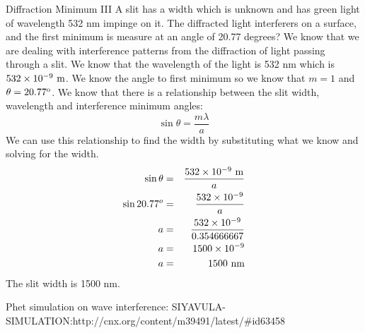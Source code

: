 \begin{wex}{Diffraction Minimum III}
{A slit has a width which is unknown and has green light of wavelength 532 nm impinge on it. The diffracted light interferers on a surface, and the first minimum is measure at an angle of 20.77 degrees? }
{
We know that we are dealing with interference patterns from the diffraction of light passing through a slit. We know that the wavelength of the light is 532 nm which is $532 \times 10^{-9}\ \rm{m}$. We know the angle to first minimum so we know that $m=1$ and $\theta = 20.77^{\rm{o}}$.
We know that there is a relationship between the slit width, wavelength and interference minimum angles:
\begin{equation*}
\sin\theta = \frac{m\lambda}{a}
\end{equation*}
We can use this relationship to find the width by substituting what we know and solving for the width.
\begin{eqnarray*}
\sin\theta &=& \frac{532\times 10^{-9} \ \rm{m}}{a} \\
\sin 20.77^{o} &=& \frac{532\times 10^{-9}}{a} \\
a &=& \frac{532\times 10^{-9}}{0.354666667}  \\
a & = & 1500 \times 10^{-9} \\
a & = & 1500\  \rm{nm} \\
\end{eqnarray*}
The slit width is 1500 nm.
}
\end{wex}
Phet simulation on wave interference: SIYAVULA-SIMULATION:http://cnx.org/content/m39491/latest/#id63458







